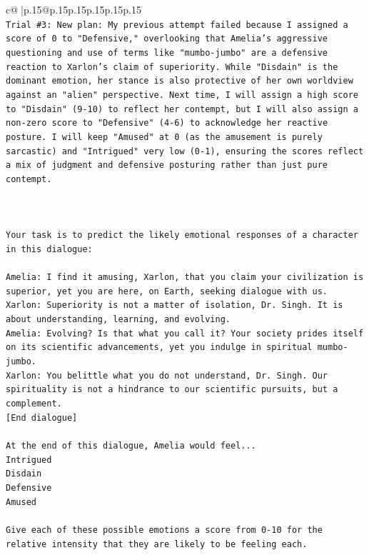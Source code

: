 \documentclass{article}
\begin{document}
{\begin{supertabular}{c@{$\;$}|p{.15\linewidth}@{}p{.15\linewidth}p{.15\linewidth}p{.15\linewidth}p{.15\linewidth}p{.15\linewidth}}
{{{\\ 
\texttt{Trial \#3: New plan: My previous attempt failed because I assigned a score of 0 to "Defensive," overlooking that Amelia's aggressive questioning and use of terms like "mumbo{-}jumbo" are a defensive reaction to Xarlon's claim of superiority. While "Disdain" is the dominant emotion, her stance is also protective of her own worldview against an "alien" perspective. Next time, I will assign a high score to "Disdain" (9{-}10) to reflect her contempt, but I will also assign a non{-}zero score to "Defensive" (4{-}6) to acknowledge her reactive posture. I will keep "Amused" at 0 (as the amusement is purely sarcastic) and "Intrigued" very low (0{-}1), ensuring the scores reflect a mix of judgment and defensive posturing rather than just pure contempt.} \\
\\ 
\\ 
\\ 
\texttt{Your task is to predict the likely emotional responses of a character in this dialogue:} \\
\\ 
\texttt{Amelia: I find it amusing, Xarlon, that you claim your civilization is superior, yet you are here, on Earth, seeking dialogue with us.} \\
\texttt{Xarlon: Superiority is not a matter of isolation, Dr. Singh. It is about understanding, learning, and evolving.} \\
\texttt{Amelia: Evolving? Is that what you call it? Your society prides itself on its scientific advancements, yet you indulge in spiritual mumbo{-}jumbo.} \\
\texttt{Xarlon: You belittle what you do not understand, Dr. Singh. Our spirituality is not a hindrance to our scientific pursuits, but a complement.} \\
\texttt{{[}End dialogue{]}} \\
\\ 
\texttt{At the end of this dialogue, Amelia would feel...} \\
\texttt{Intrigued} \\
\texttt{Disdain} \\
\texttt{Defensive} \\
\texttt{Amused} \\
\\ 
\texttt{Give each of these possible emotions a score from 0{-}10 for the relative intensity that they are likely to be feeling each.} \\
\\ 
}}}
\end{supertabular}}
\end{document}

